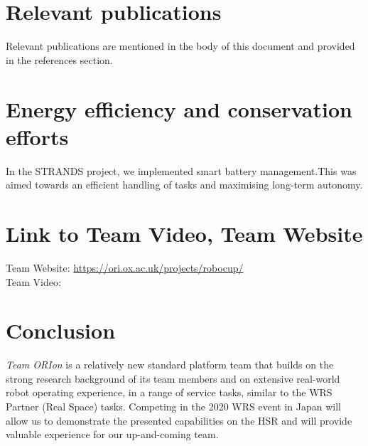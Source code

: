\documentclass[runningheads,a4paper]{llncs}
\newcommand{\teamori}{Team ORIon}
\begin{document}
\section{Relevant publications }
Relevant publications are mentioned in the body of this document and provided in the references section.

\section{Energy efficiency and conservation efforts}
In the STRANDS project, we implemented smart battery management.This was aimed towards an efficient handling of tasks and maximising long-term autonomy.

\section{Link to Team Video, Team Website}
Team Website: \url{https://ori.ox.ac.uk/projects/robocup/} \\
Team Video: \url{} 


\section{Conclusion}
\textit{\teamori{}} is a relatively new standard platform team that builds on the strong research 
background of its team members and on extensive real-world robot operating
experience, in a range of service tasks, similar to the WRS Partner (Real Space) tasks. Competing in the 2020 WRS event in Japan will allow us to demonstrate 
the presented capabilities on the HSR and will provide valuable experience
for our up-and-coming team.



\end{document}
